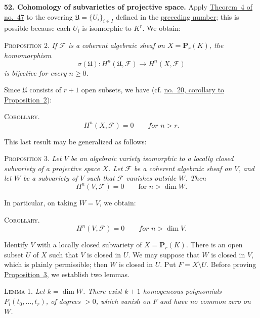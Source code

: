 
\medskip
{}\label{fac:III:1:no:52}
\textbf{52. Cohomology of subvarieties of projective space.}
Apply \hyperref[fac:II:3:thm:4]{Theorem~4 of no.~47} to the covering
$\mathfrak{U}=\{U_i\}_{i\in I}$ defined in the \hyperref[fac:III:1:no:51]{preceding number}; this is
possible because each $U_i$ is isomorphic to $K^r$. We obtain:

\label{fac:III:1:prop:2}
\textsc{Proposition 2.}
\textit{If $\mathcal{F}$ is a coherent algebraic sheaf on
$X=\mathbf{P}_r(K)$, the homomorphism
\[
\sigma(\mathfrak{U}):H^n(\mathfrak{U},\mathcal{F})
  \longrightarrow H^n(X,\mathcal{F})
\]
is bijective for every $n\geq0$.}

Since $\mathfrak{U}$ consists of $r+1$ open subsets, we have (cf. \hyperref[fac:I:3:no:20:prop:2:cor]{no.~20,
corollary to Proposition~2}):

\label{fac:III:1:no:52:cor:1}
\textsc{Corollary.}
\[
H^n(X,\mathcal{F})=0\qquad\textit{for }n>r.
\]

This last result may be generalized as follows:

\label{fac:III:1:prop:3}
\textsc{Proposition 3.}
\textit{Let $V$ be an algebraic variety isomorphic to a locally closed
subvariety of a projective space $X$. Let $\mathcal{F}$ be a coherent
algebraic sheaf on $V$, and let $W$ be a subvariety of $V$ such that
$\mathcal{F}$ vanishes outside $W$. Then
\[
H^n(V,\mathcal{F})=0\qquad\text{for }n>\dim W.
\]}

In particular, on taking $W=V$, we obtain:

\label{fac:III:1:no:52:cor:2}
\textsc{Corollary.}
\[
H^n(V,\mathcal{F})=0\qquad\textit{for }n>\dim V.
\]

Identify $V$ with a locally closed subvariety of
$X=\mathbf{P}_r(K)$. There is an open subset $U$ of $X$ such that $V$ is
closed in $U$. We may suppose that $W$ is closed in $V$, which is plainly
permissible; then $W$ is closed in $U$. Put $F=X\setminus U$. Before proving
\hyperref[fac:III:1:prop:3]{Proposition~3}, we establish two lemmas.

\label{fac:III:1:lemma:1}
\textsc{Lemma 1.}
\textit{Let $k=\dim W$. There exist $k+1$ homogeneous polynomials
$P_i(t_0,\ldots,t_r)$, of degrees $>0$, which vanish on $F$ and have no
common zero on $W$.}

